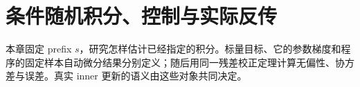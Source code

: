 \chapter{条件随机积分、控制与实际反传}
\label{est:chapter}

本章固定 prefix $s$，研究怎样估计已经指定的积分。标量目标、它的参数梯度和程序的固定样本自动微分结果分别定义；随后用同一残差校正定理计算无偏性、协方差与误差。真实 inner 更新的语义由这些对象共同决定。












